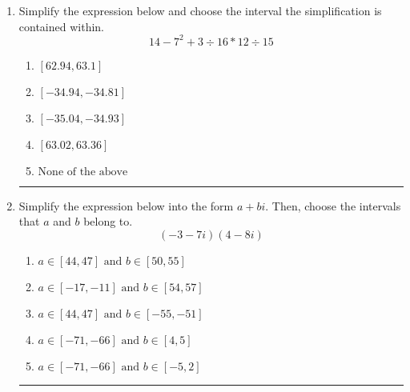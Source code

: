 \documentclass[14pt]{extbook}
\newcommand{\litem}[1]{\item#1\hspace*{-1cm}\rule{\textwidth}{0.4pt}}
\begin{document}
\begin{enumerate}
{\begin{enumerate}[label=\Alph*.]
\end{enumerate} }
\litem{
Simplify the expression below and choose the interval the simplification is contained within.\[ 14 - 7^2 + 3 \div 16 * 12 \div 15 \]\begin{enumerate}[label=\Alph*.]
\item \( [62.94, 63.1] \)
\item \( [-34.94, -34.81] \)
\item \( [-35.04, -34.93] \)
\item \( [63.02, 63.36] \)
\item \( \text{None of the above} \)

\end{enumerate} }
\litem{
Simplify the expression below into the form $a+bi$. Then, choose the intervals that $a$ and $b$ belong to.\[ (-3 - 7 i)(4 - 8 i) \]\begin{enumerate}[label=\Alph*.]
\item \( a \in [44, 47] \text{ and } b \in [50, 55] \)
\item \( a \in [-17, -11] \text{ and } b \in [54, 57] \)
\item \( a \in [44, 47] \text{ and } b \in [-55, -51] \)
\item \( a \in [-71, -66] \text{ and } b \in [4, 5] \)
\item \( a \in [-71, -66] \text{ and } b \in [-5, 2] \)

\end{enumerate} }
\end{enumerate}
\end{document}
